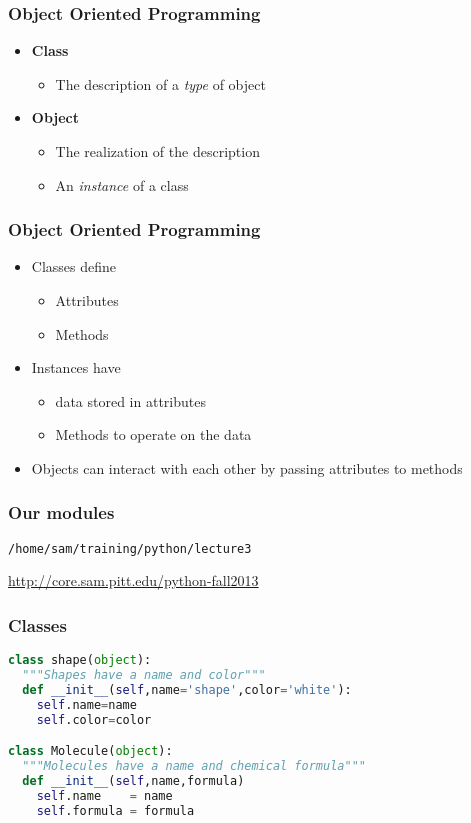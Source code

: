 \documentclass[xcolor=table,10pt,final]{beamer}
\begin{document}
\begin{frame}
  \frametitle{Object Oriented Programming}
  \begin{itemize}
    \item {\bf Class}
      \begin{itemize}
        \item The description of a {\it type} of object
      \end{itemize}
    \item {\bf Object}
      \begin{itemize}
        \item The realization of the description
        \item An {\it instance} of a class
      \end{itemize}
  \end{itemize}
\end{frame}

\begin{frame}
  \frametitle{Object Oriented Programming}
  \begin{itemize}
    \item Classes define
      \begin{itemize}
        \item Attributes
        \item Methods
      \end{itemize}
    \item Instances have
      \begin{itemize}
        \item data stored in attributes
        \item Methods to operate on the data
      \end{itemize}
    \item Objects can interact with each other by passing attributes to methods
  \end{itemize}
\end{frame}

\begin{frame}
  \frametitle{Our modules}
  {\tt /home/sam/training/python/lecture3}

  \url{http://core.sam.pitt.edu/python-fall2013}
\end{frame}

\begin{frame}[fragile]
  \frametitle{Classes}
  \begin{lstlisting}[language=Python]
class shape(object):
  """Shapes have a name and color"""
  def __init__(self,name='shape',color='white'):
    self.name=name
    self.color=color

class Molecule(object):
  """Molecules have a name and chemical formula"""
  def __init__(self,name,formula)
    self.name    = name
    self.formula = formula
\end{lstlisting}
\end{frame}
\end{document}
